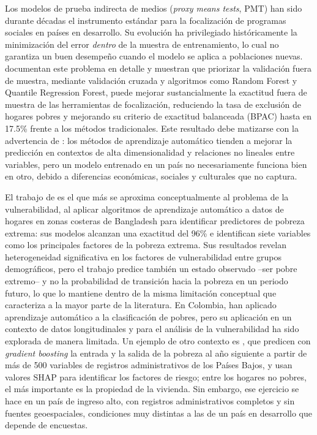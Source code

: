 \documentclass[12pt, letterpaper]{article}
\begin{document}
Los modelos de prueba indirecta de medios (\emph{proxy means tests}, PMT)
han sido durante décadas el instrumento estándar para la focalización de
programas sociales en países en desarrollo. Su evolución ha privilegiado
históricamente la minimización del error \emph{dentro} de la muestra de
entrenamiento, lo cual no garantiza un buen desempeño cuando el modelo se
aplica a poblaciones nuevas. \textcite{mcbride2018} documentan este
problema en detalle y muestran que priorizar la validación fuera de
muestra, mediante validación cruzada y algoritmos como Random Forest y
Quantile Regression Forest, puede mejorar sustancialmente la exactitud
fuera de muestra de las herramientas de focalización, reduciendo la tasa
de exclusión de hogares pobres y mejorando su criterio de exactitud
balanceada (BPAC) hasta en 17.5\% frente a los métodos tradicionales. Este resultado debe matizarse con la advertencia de
\textcite{usmanova2022}: los métodos de aprendizaje automático tienden a
mejorar la predicción en contextos de alta dimensionalidad y relaciones
no lineales entre variables, pero un modelo entrenado en un país no
necesariamente funciona bien en otro, debido a diferencias económicas,
sociales y culturales que no captura.

El trabajo de \textcite{ferdausi2025} es el que más se aproxima
conceptualmente al problema de la vulnerabilidad, al aplicar algoritmos de
aprendizaje automático a datos de hogares en zonas costeras de Bangladesh
para identificar predictores de pobreza extrema: sus modelos alcanzan una
exactitud del 96\% e identifican siete variables como los principales
factores de la pobreza extrema. Sus
resultados revelan heterogeneidad significativa en los factores de
vulnerabilidad entre grupos demográficos, pero el trabajo predice también
un estado observado --ser pobre extremo-- y no la probabilidad de transición
hacia la pobreza en un periodo futuro, lo que lo mantiene dentro de la
misma limitación conceptual que caracteriza a la mayor parte de la
literatura. En
Colombia, \textcite{muneton2022} han aplicado aprendizaje automático a la
clasificación de pobres, pero su aplicación en un contexto de datos
longitudinales y para el análisis de la vulnerabilidad ha sido explorada
de manera limitada. Un ejemplo de otro contexto es \textcite{burger2021}, que predicen
con \emph{gradient boosting} la entrada y la salida de la pobreza al año
siguiente a partir de más de 500 variables de registros administrativos
de los Países Bajos, y usan valores SHAP para identificar los factores de
riesgo; entre los hogares no pobres, el más importante es la propiedad de
la vivienda. Sin embargo, ese ejercicio se hace en un país de ingreso alto, con
registros administrativos completos y sin fuentes geoespaciales,
condiciones muy distintas a las de un país en desarrollo que depende de
encuestas.
\end{document}
